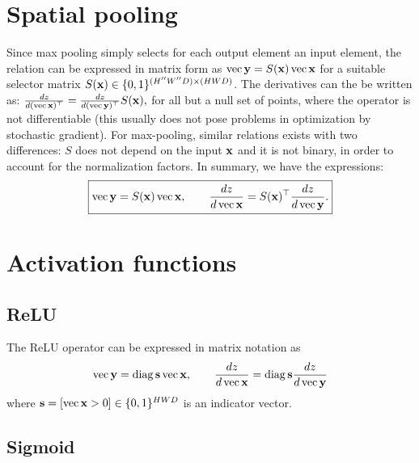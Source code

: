 \section{Spatial pooling}\label{s:impl-pooling}

Since max pooling simply selects for each output element an input element, the relation can be expressed in matrix form as
$
    \operatorname{vec}\mathbf{y} = S(\mathbf{x}) \operatorname{vec} \mathbf{x}
$
for a suitable selector matrix $S(\mathbf{x})\in\{0,1\}^{(H''W''D) \times (HWD)}$. The derivatives can the be written as:
$
\frac{d z}{d (\operatorname{vec} \mathbf{x})^\top}
=
\frac{d z}{d (\operatorname{vec} \mathbf{y})^\top}
S(\mathbf{x}),
$
for all but a null set of points, where the operator is not differentiable (this usually does not pose problems in optimization by stochastic gradient). For max-pooling, similar relations exists with two differences: $S$ does not depend on the input $\mathbf{x}$ and it is not binary, in order to account for the normalization factors. In summary, we have the expressions:
\begin{equation}\label{e:max-mat}
\boxed{
\operatorname{vec}\mathbf{y} = S(\mathbf{x}) \operatorname{vec} \mathbf{x},
\qquad
\frac{d z}{d \operatorname{vec} \mathbf{x}}
=
S(\mathbf{x})^\top
\frac{d z}{d \operatorname{vec} \mathbf{y}}.
}
\end{equation}



\section{Activation functions}\label{s:impl-activation}

\subsection{ReLU}\label{s:impl-relu}

The ReLU operator can be expressed in matrix notation as
\[
\operatorname{vec}\mathbf{y} = \operatorname{diag}\mathbf{s} \operatorname{vec} \mathbf{x},
\qquad
\frac{d z}{d \operatorname{vec} \mathbf{x}}
=
\operatorname{diag}\mathbf{s}
\frac{d z}{d \operatorname{vec} \mathbf{y}}
\]
where $\mathbf{s} = [\operatorname{vec} \mathbf{x} > 0] \in\{0,1\}^{HWD}$ is an indicator vector.

\subsection{Sigmoid}\label{s:impl-sigmoid}

